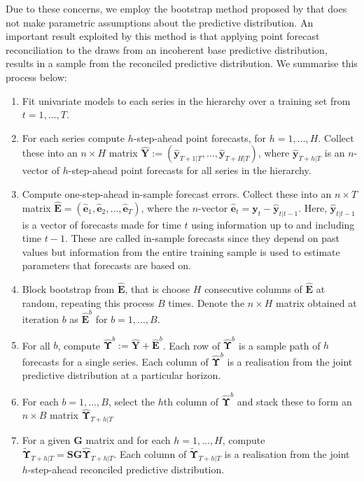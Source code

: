 \documentclass[graybox]{svmult}
\begin{document}
Due to these concerns, we employ the bootstrap method proposed by \citet{GamEtAl2018} that does not make parametric assumptions about the predictive distribution. An important result exploited by this method is that applying point forecast reconciliation to the draws from an incoherent base predictive distribution, results in a sample from the reconciled predictive distribution. We summarise this process below:


\begin{enumerate}
	\item Fit univariate models to each series in the hierarchy over a training set from $t=1,\dots,T$.
	\item For each series compute $h$-step-ahead point forecasts, for $h=1,\dots,H$. Collect these into an $n\times H$ matrix $\hat{\bm{Y}}:=(\hat{\bm{y}}_{T+1|T},\dots,\hat{\bm{y}}_{T+H|T})$, where $\hat{\bm{y}}_{T+h|T}$ is an $n$-vector of $h$-step-ahead point forecasts for all series in the hierarchy.
	\item Compute one-step-ahead in-sample forecast errors. Collect these into an $n \times T$ matrix ${\hat{\bm E}}=(\hat{\bm{e}}_1,\hat{\bm{e}}_2,\dots,\hat{\bm{e}}_T)$, where the $n$-vector $\hat{\bm{e}}_t={\bm{y}}_t-\hat{\bm {y}}_{t|t-1}$. Here, $\hat{\bm {y}}_{t|t-1}$ is a vector of forecasts made for time $t$ using information up to and including time $t-1$. These are called in-sample forecasts since they depend on past values but information from the entire training sample is used to estimate parameters that forecasts are based on.
	\item Block bootstrap from $\hat{\bm{E}}$, that is choose $H$ consecutive columns of $\hat{{\bm E}}$ at random, repeating this process $B$ times. Denote the $n\times H$ matrix obtained at iteration $b$ as $\hat{{\bm E}}^b$ for $b=1,\dots,B$.
	\item For all $b$, compute $\hat{\bm\Upsilon}^b:=\hat{\bm{Y}}+\hat{\bm{E}}^b$. Each row of $\hat{\bm \Upsilon}^b$ is a sample path of $h$ forecasts for a single series. Each column of $\hat{\bm \Upsilon}^b$ is a realisation from the joint predictive distribution at a particular horizon.
	\item For each $b=1,\dots,B$, select the $h$th column of $\hat{\bm \Upsilon}^b$ and stack these to form an $n\times B$ matrix $\hat{\bm{\Upsilon}}_{T+h|T}$
	\item For a given ${\bm G}$ matrix and for each $h=1,\dots,H$, compute $\tilde{\bm{\Upsilon}}_{T+h|T}={\bm S}{\bm G}\hat{\bm{\Upsilon}}_{T+h|T}$.  Each column of $\tilde{\bm \Upsilon}_{T+h|T}$ is a realisation from the joint $h$-step-ahead reconciled predictive distribution.
\end{enumerate}
\end{document}

